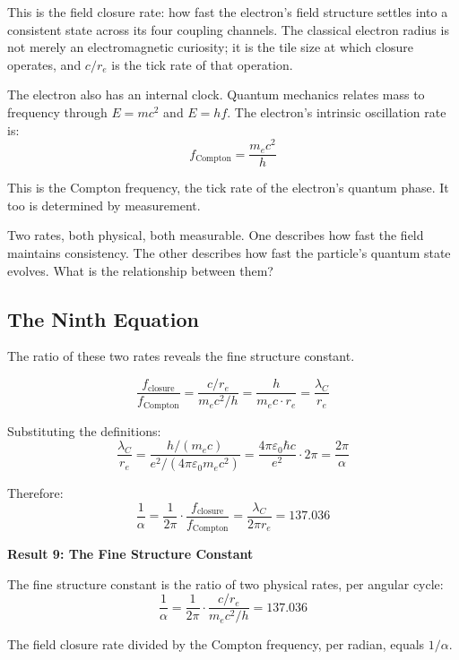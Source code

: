 \documentclass[aps,prd,preprint,superscriptaddress,showpacs,preprintnumbers,amsmath,amssymb,nofootinbib]{revtex4-2}
\begin{document}
This is the field closure rate: how fast the electron's field structure settles into a consistent state across its four coupling channels. The classical electron radius is not merely an electromagnetic curiosity; it is the tile size at which closure operates, and $c/r_e$ is the tick rate of that operation.

The electron also has an internal clock. Quantum mechanics relates mass to frequency through $E = mc^2$ and $E = hf$. The electron's intrinsic oscillation rate is:
\begin{equation}
f_{\text{Compton}} = \frac{m_e c^2}{h}
\end{equation}

This is the Compton frequency, the tick rate of the electron's quantum phase. It too is determined by measurement.

Two rates, both physical, both measurable. One describes how fast the field maintains consistency. The other describes how fast the particle's quantum state evolves. What is the relationship between them?

\subsection{The Ninth Equation}
\label{subsec:ninth}

The ratio of these two rates reveals the fine structure constant.

\begin{equation}
\frac{f_{\text{closure}}}{f_{\text{Compton}}} = \frac{c/r_e}{m_e c^2/h} = \frac{h}{m_e c \cdot r_e} = \frac{\lambda_C}{r_e}
\end{equation}

Substituting the definitions:
\begin{equation}
\frac{\lambda_C}{r_e} = \frac{h/(m_e c)}{e^2/(4\pi\varepsilon_0 m_e c^2)} = \frac{4\pi\varepsilon_0 \hbar c}{e^2} \cdot 2\pi = \frac{2\pi}{\alpha}
\end{equation}

Therefore:
\begin{equation}
\frac{1}{\alpha} = \frac{1}{2\pi} \cdot \frac{f_{\text{closure}}}{f_{\text{Compton}}} = \frac{\lambda_C}{2\pi r_e} = 137.036
\end{equation}

\vspace{1.5em}
\noindent
\colorbox{resultgreen}{\parbox{\dimexpr\textwidth-2\fboxsep\relax}{%
\vspace{0.8em}
\centering
\textbf{\large Result 9: The Fine Structure Constant}

\vspace{0.5em}
The fine structure constant is the ratio of two physical rates, per angular cycle:
\boldmath
\begin{equation}
\frac{1}{\alpha} = \frac{1}{2\pi} \cdot \frac{c/r_e}{m_e c^2/h} = 137.036
\end{equation}
\unboldmath

\vspace{0.3em}
The field closure rate divided by the Compton frequency, per radian, equals $1/\alpha$.
\vspace{0.5em}
}}
\vspace{1cm}
\end{document}
